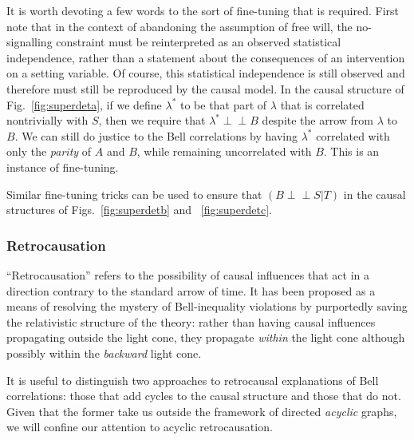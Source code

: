\documentclass[letterpaper,onecolumn,nofootinbib]{revtex4}
\def\indep{\perp\!\!\!\!\perp}
\begin{document}
It is worth devoting a few words to the sort of fine-tuning that is required.  First note that in the context of abandoning the assumption of free will, the no-signalling constraint must be reinterpreted as an observed statistical independence, rather than a statement about the consequences of an intervention on a setting variable.  Of course, this statistical independence is still observed and therefore must still be reproduced by the causal model. In the causal structure of Fig.~\ref{fig:superdeta}, if we define $\lambda^*$ to be that part of $\lambda$ that is correlated nontrivially with $S$, then we require that $\lambda^* \indep B$ despite the arrow from $\lambda$ to $B$.  We can still do justice to the Bell correlations by having $\lambda^*$ correlated with only
the \emph{parity} of $A$ and $B$, while remaining uncorrelated with $B$.  This is an instance of fine-tuning.

Similar fine-tuning tricks can be used to ensure that $(B \indep S|T)$ in the causal structures of Figs.~\ref{fig:superdetb} and ~\ref{fig:superdetc}.


\subsubsection{Retrocausation}

``Retrocausation'' refers to the possibility of causal influences that act in a direction contrary to the standard arrow of time. It has been proposed as a means of resolving the mystery of Bell-inequality violations \cite{deBeauregard1953,Cramer1986,Sutherland2006,Price2008,Wharton2010} by purportedly saving the relativistic structure of the theory: rather than having causal influences propagating outside the light cone, they propagate \emph{within} the light cone although possibly within the \emph{backward} light cone.

It is useful to distinguish two approaches to retrocausal explanations of Bell correlations: those that add cycles to the causal structure and those that do not.  Given that the former take us outside the framework of directed \emph{acyclic} graphs, we will confine our attention to acyclic retrocausation.
\end{document}
